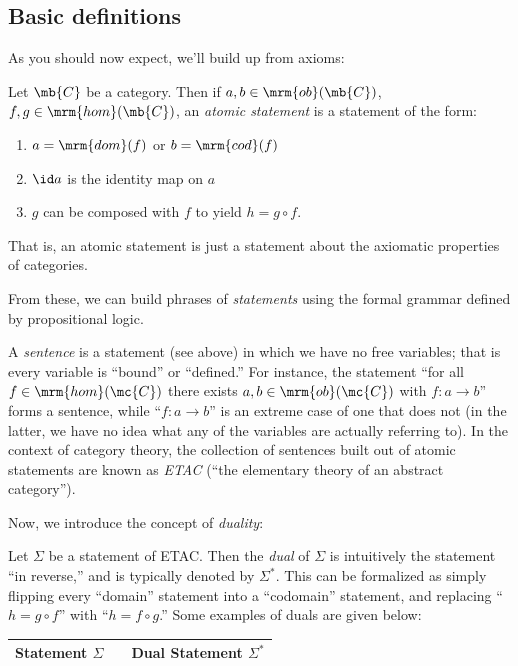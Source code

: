 \documentclass{fkbook}
\renewcommand{\dom}{\mrm{dom}}
\renewcommand{\cod}{\mrm{cod}}
\newcommand{\ob}{\mrm{ob}}
\newcommand{\homm}{\mrm{hom}}
\begin{document}
\begin{adjustwidth}{1em}{1em}
  \subsection{Basic definitions}
  As you should now expect, we'll build up from axioms:
  \begin{definition}
    Let $\mb{C}$ be a category. Then if $a,b \in \ob(\mb{C})$, $f,g
    \in \homm(\mb{C})$, an \emph{atomic statement} is a statement of
    the form:
    \begin{enumerate}
      \item $a = \dom(f)$ or $b = \cod(f)$
      \item $\id a$ is the identity map on $a$
      \item $g$ can be composed with $f$ to yield $h = g \circ f$.
    \end{enumerate}
    That is, an atomic statement is just a statement about the
    axiomatic properties of categories.
  \end{definition}
  From these, we can build phrases of \emph{statements} using the
  formal grammar defined by propositional logic.
  \begin{definition}[Sentences]
    A \emph{sentence} is a statement (see above) in which we have no
    free variables; that is every variable is ``bound'' or
    ``defined.'' For instance, the statement ``for all $f \in
    \homm(\mc{C})$ there exists $a,b \in \ob(\mc{C})$ with $f : a \to
    b$'' forms a sentence, while ``$f : a \to b$'' is an extreme case
    of one that does not (in the latter, we have no idea what any of
    the variables are actually referring to). In the context of
    category theory, the collection of sentences built out of atomic
    statements are known as \emph{ETAC} (``the elementary theory of an
    abstract category'').
  \end{definition}
  Now, we introduce the concept of \emph{duality}:
  \begin{definition}[Duality]
    Let $\Sigma$ be a statement of ETAC. Then the \emph{dual} of
    $\Sigma$ is intuitively the statement ``in reverse,'' and is
    typically denoted by $\Sigma^*$. This can be formalized as simply
    flipping every ``domain'' statement into a ``codomain'' statement,
    and replacing ``$h = g \circ f$'' with ``$h = f \circ g$.'' Some
    examples of duals are given below:
    \begin{table}[H]
      \centering
      \begin{tabular}{@{}lll@{}}
        \toprule
        Statement $\Sigma$ && Dual Statement $\Sigma^*$ \\ \midrule

\end{tabular}
\end{table}
\end{definition}
\end{adjustwidth}
\end{document}
